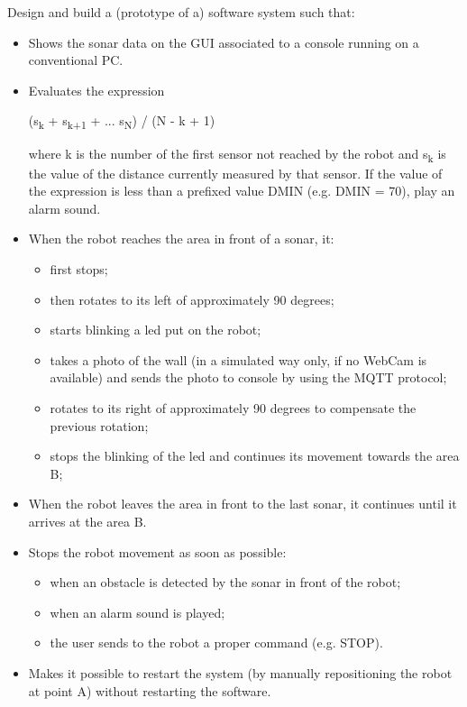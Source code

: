\documentclass[a4paper]{article}
\begin{document}
Design and build a (prototype of a) software system such that:
\begin{itemize}
	\item Shows the sonar data on the GUI associated to a console running on a conventional PC.
	\item Evaluates the expression
	
	(s\textsubscript{k} + s\textsubscript{k+1} + ... s\textsubscript{N}) / (N - k + 1)
	
	where k is the number of the first sensor not reached by the robot and s\textsubscript{k} is the value of the distance currently measured by that sensor. If the value of the expression is less than a prefixed value DMIN (e.g. DMIN = 70), play an alarm sound.
	\item When the robot reaches the area in front of a sonar, it:
	\begin{itemize}
		\item first stops;
		\item then rotates to its left of approximately 90 degrees;
		\item starts blinking a led put on the robot;
		\item takes a photo of the wall (in a simulated way only, if no WebCam is available) and sends the photo to console by using the MQTT protocol;
		\item rotates to its right of approximately 90 degrees to compensate the previous rotation;
		\item stops the blinking of the led and continues its movement towards the area B;
	\end{itemize}
	\item When the robot leaves the area in front to the last sonar, it continues until it arrives at the area B.
	\item Stops the robot movement as soon as possible:
	\begin{itemize}
		\item when an obstacle is detected by the sonar in front of the robot;
		\item when an alarm sound is played;
		\item the user sends to the robot a proper command (e.g. STOP).
	\end{itemize}
	\item Makes it possible to restart the system (by manually repositioning the robot at point A) without restarting the software.
\end{itemize}
\end{document}
